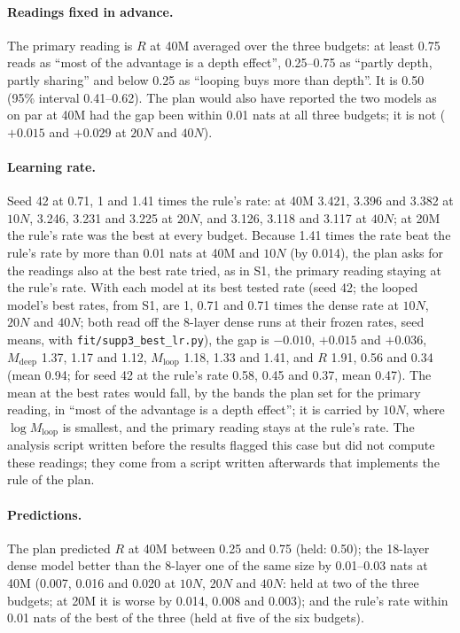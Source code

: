 \paragraph{Readings fixed in advance.} The primary reading is $R$ at 40M averaged over the three budgets: at least 0.75
reads as ``most of the advantage is a depth effect'', 0.25--0.75 as ``partly depth, partly sharing'' and below 0.25 as
``looping buys more than depth''. It is 0.50 (95\% interval 0.41--0.62). The plan would also have reported the two
models as on par at 40M had the gap been within 0.01 nats at all three budgets; it is not ($+0.015$ and $+0.029$ at $20N$
and $40N$).

\paragraph{Learning rate.} Seed 42 at 0.71, 1 and 1.41 times the rule's rate: at 40M 3.421, 3.396 and 3.382 at $10N$,
3.246, 3.231 and 3.225 at $20N$, and 3.126, 3.118 and 3.117 at $40N$; at 20M the rule's rate was the best at every
budget. Because 1.41 times the rate beat the rule's rate by more than 0.01 nats at 40M and $10N$ (by 0.014), the plan
asks for the readings also at the best rate tried, as in S1, the primary reading staying at the rule's rate. With each
model at its best tested rate (seed 42; the looped model's best rates, from S1, are 1, 0.71 and 0.71 times the dense
rate at $10N$, $20N$ and $40N$; both read off the 8-layer dense runs at their frozen rates, seed means, with
\texttt{fit/supp3\_best\_lr.py}), the gap is $-0.010$, $+0.015$ and $+0.036$, $M_{\mathrm{deep}}$ 1.37, 1.17 and 1.12,
$M_{\mathrm{loop}}$ 1.18, 1.33 and 1.41, and $R$ 1.91, 0.56 and 0.34 (mean 0.94; for seed 42 at the rule's rate 0.58,
0.45 and 0.37, mean 0.47). The mean at the best rates would fall, by the bands the plan set for the primary reading, in ``most of the advantage
is a depth effect''; it is carried by $10N$, where $\log M_{\mathrm{loop}}$ is smallest, and the primary reading stays
at the rule's rate.
The analysis script written before the results flagged this case but did not compute these readings; they come from a
script written afterwards that implements the rule of the plan.

\paragraph{Predictions.} The plan predicted $R$ at 40M between 0.25 and 0.75 (held: 0.50); the 18-layer dense model
better than the 8-layer one of the same size by 0.01--0.03 nats at 40M (0.007, 0.016 and 0.020 at $10N$, $20N$ and $40N$:
held at two of the three budgets; at 20M it is worse by 0.014, 0.008 and 0.003); and the rule's rate within 0.01 nats of
the best of the three (held at five of the six budgets).

